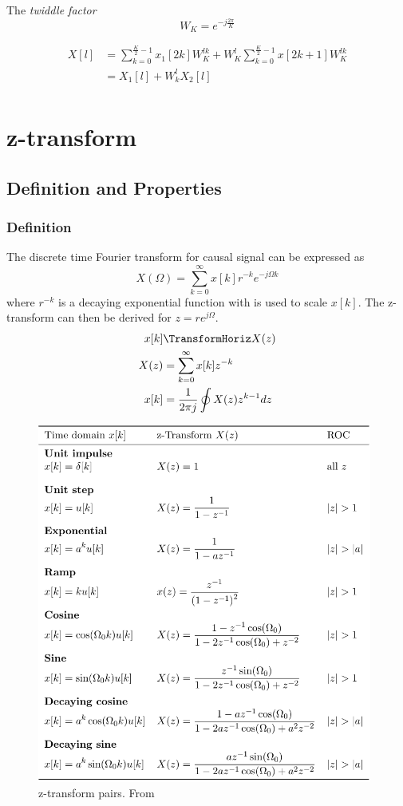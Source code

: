 The \textit{twiddle factor}
\begin{equation*}
    W_K = e^{-j\frac{2\pi}{K}}
\end{equation*}

\begin{align*}
    X[l] &= \sum_{k=0}^{\frac{K}{2}-1}x_1[2k]W_K^{lk} + W_K^{l} \sum_{k=0}^{\frac{K}{2}-1}x[2k+1]W_K^{lk}  \\
    &= X_1[l] + W_k^l X_2[l] \\
\end{align*}


\section{z-transform}
\subsection{Definition and Properties}
\subsubsection{Definition}
The discrete time Fourier transform for causal signal can be expressed as
\begin{equation*}
    X(\Omega) = \sum_{k=0}^{\infty}x[k]r^{-k}e^{-j\Omega k}
\end{equation*}
where $r^{-k}$ is a decaying exponential function with is used to scale $x[k]$.
The z-transform can then be derived for $z=re^{j\Omega}$.
\begin{align*}
    x[k] &\TransformHoriz X(z) \\
    X(z) &= \sum_{k=0}^{\infty} x[k]z^{-k} \\
    x[k] &= \frac{1}{2\pi j} \oint X(z)z^{k-1}dz \\
\end{align*}

\begin{figure}[!ht]
    \centering
    \includegraphics[width=11cm]{image/z-transform_pairs.png}
    \caption{z-transform pairs. From \cite{}}
    \label{fig:z-transform_pairs}
\end{figure}


